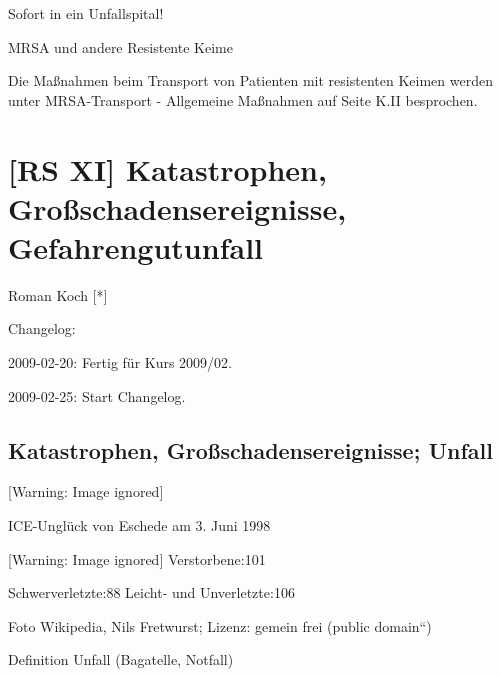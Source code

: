 \documentclass{article}
\begin{document}
Sofort in ein Unfallspital! 

MRSA und andere Resistente Keime

Die Ma{\ss}nahmen beim Transport von Patienten mit resistenten Keimen
werden unter {\quotedblbase}MRSA-Transport - Allgemeine
Ma{\ss}nahmen{\quotedblbase} auf Seite
K.II{\guillemotright}\pageref{bkm:RefHeading40262819} besprochen.

\section{[RS XI] Katastrophen, Gro{\ss}schadensereignisse,
Gefahrengutunfall}
Roman Koch [*]

Changelog:

2009-02-20: Fertig f\"ur Kurs 2009/02.

2009-02-25: Start Changelog.

\subsection{Katastrophen, Gro{\ss}schadensereignisse; Unfall}
\begin{minipage}{13.7cm}
  [Warning: Image ignored] %
 

ICE-Ungl\"uck von Eschede am 3. Juni 1998

 [Warning: Image ignored] %
Verstorbene:101

Schwerverletzte:88  Leicht- und Unverletzte:106

Foto Wikipedia, Nils Fretwurst; Lizenz: gemein frei
({\quotedblbase}public domain{\textquotedblleft})

\end{minipage}

Definition Unfall (Bagatelle, Notfall)
\end{document}
